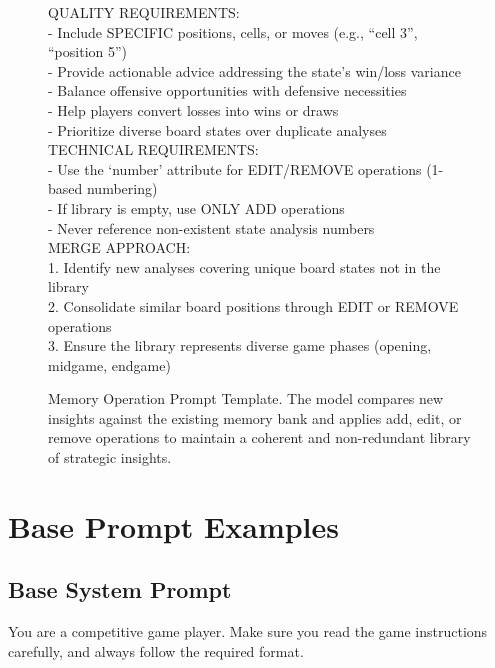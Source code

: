 \begin{figure}[H]
\begin{tcolorbox}
QUALITY REQUIREMENTS:\\
- Include SPECIFIC positions, cells, or moves (e.g., ``cell 3'', ``position 5'')\\
- Provide actionable advice addressing the state's win/loss variance\\
- Balance offensive opportunities with defensive necessities\\
- Help players convert losses into wins or draws\\
- Prioritize diverse board states over duplicate analyses\\

TECHNICAL REQUIREMENTS:\\
- Use the `number' attribute for EDIT/REMOVE operations (1-based numbering)\\
- If library is empty, use ONLY ADD operations\\
- Never reference non-existent state analysis numbers\\

MERGE APPROACH:\\
1. Identify new analyses covering unique board states not in the library\\
2. Consolidate similar board positions through EDIT or REMOVE operations\\
3. Ensure the library represents diverse game phases (opening, midgame, endgame)
\end{tcolorbox}

\caption{Memory Operation Prompt Template. The model compares new insights against the existing memory bank and applies add, edit, or remove operations to maintain a coherent and non-redundant library of strategic insights.}
\label{fig:memory_operation_prompt}
\end{figure}

\section{Base Prompt Examples}
\label{appendix: basepromptexample}

\subsection{Base System Prompt}
\begin{tcolorbox}[
    colback=blue!5!white,
    colframe=blue!40!white,
    left=1mm, right=1mm, top=1mm, bottom=1mm,
    width=\textwidth,
    enhanced,
    attach boxed title to top center={yshift=-2mm},
    boxed title style={colback=blue!40!white},
    label={box:basesystemprompt}
]
You are a competitive game player. Make sure you read the game instructions carefully, and always follow the required format.
\end{tcolorbox}

